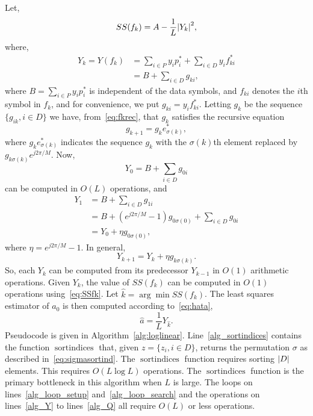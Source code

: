 \documentclass[journal]{IEEEtran}
\begin{document}
Let,
\begin{equation}\label{eq:SSfk}
SS(f_k) = A - \frac{1}{L}{\left\vert Y_k \right\vert}^2,
\end{equation}
where, 
\begin{align*}
Y_k = Y( f_k ) &= \sum_{i \in P} y_i p_i^*  + \sum_{i \in D} y_i f_{ki}^* \\
&= B + \sum_{i \in D}g_{ki},
\end{align*}
where $B = \sum_{i \in P} y_i p_i^*$ is independent of the data symbols, and $f_{ki}$ denotes the $i$th symbol in $f_k$, and for convenience, we put $g_{ki}  = y_i f_{ki}^*$.  Letting $g_{k}$ be the sequence $\{g_{ik}, i \in D\}$ we have, from~\eqref{eq:fkrec}, that $g_k$ satisfies the recursive equation
\[
g_{k+1} = g_{k} e_{\sigma(k)}^*,
\]
where $g_{k} e_{\sigma(k)}^*$ indicates the sequence $g_k$ with the $\sigma(k)$th element replaced by $g_{k \sigma(k)}e^{j2\pi/M}$.  Now,
\[
Y_0 = B + \sum_{i \in D} g_{0i}
\] 
can be computed in $O(L)$ operations, and
\begin{align*}
Y_1 &= B + \sum_{i \in D} g_{1i} \\
&= B +  (e^{j2\pi/M} - 1)g_{0\sigma(0)} + \sum_{i \in D} g_{0i} \\
&= Y_0 + \eta g_{0\sigma(0)},
\end{align*}
where $\eta = e^{j2\pi/M} - 1$.  In general,
\[
Y_{k+1} = Y_k + \eta g_{k\sigma(k)}.
\]
So, each $Y_k$ can be computed from its predecessor $Y_{k-1}$ in $O(1)$ arithmetic operations.  Given $Y_k$, the value of $SS(f_k)$ can be computed in $O(1)$ operations using~\eqref{eq:SSfk}.  Let $\hat{k} = \arg\min SS(f_k)$.  The least squares estimator of $a_0$ is then computed according to~\eqref{eq:hata},
\begin{equation}\label{eq:ahatYhat}
\hat{a} = \frac{1}{L} Y_{\hat{k}}.
\end{equation}
Pseudocode is given in Algorithm~\ref{alg:loglinear}.  Line~\ref{alg_sortindices} contains the function $\operatorname{sortindices}$ that, given $z = \{z_i, i \in D\}$, returns the permutation $\sigma$ as described in~\eqref{eq:sigmasortind}.  The $\operatorname{sortindices}$ function requires sorting ${\left\vert D \right\vert}$ elements.  This requires $O(L \log L)$ operations.  The $\operatorname{sortindices}$ function is the primary bottleneck in this algorithm when $L$ is large.  The loops on lines~\ref{alg_loop_setup} and~\ref{alg_loop_search} and the operations on lines~\ref{alg_Y} to lines~\ref{alg_Q} all require $O(L)$ or less operations.  %
\end{document}
